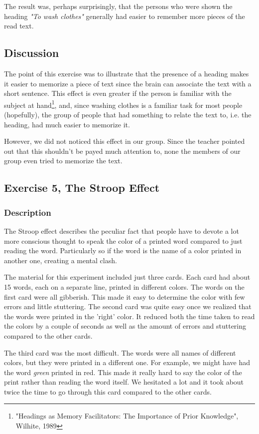\documentclass[10pt, a4paper]{article}
\begin{document}
The result was, perhaps surprisingly, that the persons who were shown the heading \emph{"To wash clothes"} generally had easier to remember more pieces of the read text.

\subsection{Discussion}
The point of this exercise was to illustrate that the presence of a heading makes it easier to memorize a piece of text since the brain can associate the text with a short sentence. This effect is even greater if the person is familiar with the subject at hand\footnote{"Headings as Memory Facilitators: The Importance of Prior Knowledge", Wilhite, 1989}, and, since washing clothes is a familiar task for most people (hopefully), the group of people that had something to relate the text to, i.e. the heading, had much easier to memorize it.

However, we did not noticed this effect in our group. Since the teacher pointed out that this shouldn't be payed much attention to, none the members of our group even tried to memorize the text.

\subsection{Exercise 5, The Stroop Effect}
\subsubsection{Description}
The Stroop effect describes the peculiar fact that people have to devote a lot more conscious thought to speak the color of a printed word compared to just reading the word. Particularly so if the word is the name of a color printed in another one, creating a mental clash.

The material for this experiment included just three cards.  Each card had about 15 words, each on a separate line, printed in different colors.  The words on the first card were all gibberish. This made it easy to determine the color with few errors and little stuttering. 
The second card was quite easy once we realized that the words were printed in the 'right' color. It reduced both the time taken to read the colors by a couple of seconds as well as the amount of errors and stuttering compared to the other cards.

The third card was the most difficult. The words were all names of different colors, but they were printed in a different one. For example, we might have had the word \emph{green} printed in red. This made it really hard to say the color of the print rather than reading the word itself.  We hesitated a lot and it took about twice the time to go through this card compared to the other cards. 
\end{document}
